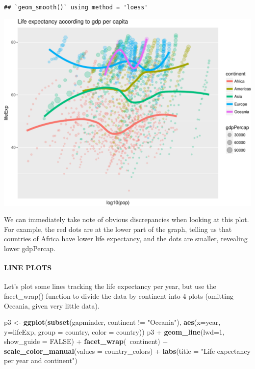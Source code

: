 \documentclass[]{article}
\newenvironment{Shaded}{\begin{snugshade}}{\end{snugshade}}
\newcommand{\KeywordTok}[1]{\textcolor[rgb]{0.13,0.29,0.53}{\textbf{{#1}}}}
\newcommand{\DataTypeTok}[1]{\textcolor[rgb]{0.13,0.29,0.53}{{#1}}}
\newcommand{\DecValTok}[1]{\textcolor[rgb]{0.00,0.00,0.81}{{#1}}}
\newcommand{\StringTok}[1]{\textcolor[rgb]{0.31,0.60,0.02}{{#1}}}
\newcommand{\OtherTok}[1]{\textcolor[rgb]{0.56,0.35,0.01}{{#1}}}
\newcommand{\NormalTok}[1]{{#1}}
\let\oldparagraph\paragraph
\renewcommand{\paragraph}[1]{\oldparagraph{#1}\mbox{}}
\begin{document}
\begin{verbatim}
## `geom_smooth()` using method = 'loess'
\end{verbatim}

\includegraphics{gapminder-exploration-phase2_files/figure-latex/unnamed-chunk-16-1.pdf}

We can immediately take note of obvious discrepancies when looking at
this plot. For example, the red dots are at the lower part of the graph,
telling us that countries of Africa have lower life expectancy, and the
dots are smaller, revealing lower gdpPercap.

\paragraph{LINE PLOTS}\label{line-plots}

Let's plot some lines tracking the life expectancy per year, but use the
facet\_wrap() function to divide the data by continent into 4 plots
(omitting Oceania, given very little data).

\begin{Shaded}
\begin{Highlighting}[]
\NormalTok{p3 <-}\StringTok{ }\KeywordTok{ggplot}\NormalTok{(}\KeywordTok{subset}\NormalTok{(gapminder, continent !=}\StringTok{ "Oceania"}\NormalTok{), }\KeywordTok{aes}\NormalTok{(}\DataTypeTok{x=}\NormalTok{year, }\DataTypeTok{y=}\NormalTok{lifeExp, }\DataTypeTok{group =} \NormalTok{country, }\DataTypeTok{color =} \NormalTok{country)) }
\NormalTok{p3 +}\StringTok{ }\KeywordTok{geom_line}\NormalTok{(}\DataTypeTok{lwd=}\DecValTok{1}\NormalTok{, }\DataTypeTok{show_guide =} \OtherTok{FALSE}\NormalTok{) +}
\StringTok{  }\KeywordTok{facet_wrap}\NormalTok{(~continent) +}
\StringTok{  }\KeywordTok{scale_color_manual}\NormalTok{(}\DataTypeTok{values =} \NormalTok{country_colors) +}
\StringTok{  }\KeywordTok{labs}\NormalTok{(}\DataTypeTok{title =} \StringTok{"Life expectancy per year and continent"}\NormalTok{)}
\end{Highlighting}
\end{Shaded}
\end{document}
